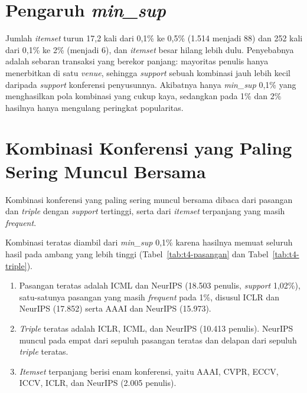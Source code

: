\section{Pengaruh \textit{min\_sup}}
\label{sec:hasil-t4-minsup}
Jumlah \textit{itemset} turun 17,2 kali dari 0,1\% ke 0,5\% (1.514 menjadi 88) dan 252 kali dari 0,1\% ke 2\% (menjadi 6), dan \textit{itemset} besar hilang lebih dulu. Penyebabnya adalah sebaran transaksi yang berekor panjang: mayoritas penulis hanya menerbitkan di satu \textit{venue}, sehingga \textit{support} sebuah kombinasi jauh lebih kecil daripada \textit{support} konferensi penyusunnya. Akibatnya hanya \textit{min\_sup} 0,1\% yang menghasilkan pola kombinasi yang cukup kaya, sedangkan pada 1\% dan 2\% hasilnya hanya mengulang peringkat popularitas.

\section{Kombinasi Konferensi yang Paling Sering Muncul Bersama}
\label{sec:hasil-t4-kombinasi}
Kombinasi konferensi yang paling sering muncul bersama dibaca dari pasangan dan \textit{triple} dengan \textit{support} tertinggi, serta dari \textit{itemset} terpanjang yang masih \textit{frequent}.

Kombinasi teratas diambil dari \textit{min\_sup} 0,1\% karena hasilnya memuat seluruh hasil pada ambang yang lebih tinggi (Tabel~\ref{tab:t4-pasangan} dan Tabel~\ref{tab:t4-triple}).
\begin{enumerate}
\item Pasangan teratas adalah ICML dan NeurIPS (18.503 penulis, \textit{support} 1,02\%), satu-satunya pasangan yang masih \textit{frequent} pada 1\%, disusul ICLR dan NeurIPS (17.852) serta AAAI dan NeurIPS (15.973).
\item \textit{Triple} teratas adalah ICLR, ICML, dan NeurIPS (10.413 penulis). NeurIPS muncul pada empat dari sepuluh pasangan teratas dan delapan dari sepuluh \textit{triple} teratas.
\item \textit{Itemset} terpanjang berisi enam konferensi, yaitu AAAI, CVPR, ECCV, ICCV, ICLR, dan NeurIPS (2.005 penulis).
\end{enumerate}

